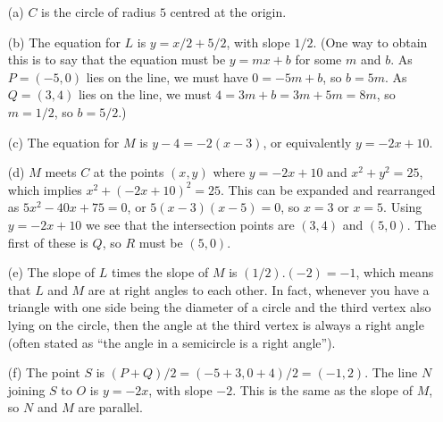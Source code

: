 \documentclass[a4paper]{amsart}
\theoremstyle{definition}
\newenvironment{solution}{{\noindent \bf Solution:}}{}
\begin{document}
\begin{solution}
 \begin{center}\end{center}
 \begin{itemize}
  \item[(a)] $C$ is the circle of radius $5$ centred at the origin.
  \item[(b)] The equation for $L$ is $y=x/2+5/2$, with slope $1/2$.
   (One way to obtain this is to say that the equation must be $y=mx+b$
   for some $m$ and $b$.  As $P=(-5,0)$ lies on the line, we must have
   $0=-5m+b$, so $b=5m$.  As $Q=(3,4)$ lies on the line, we must
   $4=3m+b=3m+5m=8m$, so $m=1/2$, so $b=5/2$.)
  \item[(c)] The equation for $M$ is $y-4=-2(x-3)$, or equivalently
   $y=-2x+10$. 
  \item[(d)] $M$ meets $C$ at the points $(x,y)$ where $y=-2x+10$
   and $x^2+y^2=25$, which implies $x^2+(-2x+10)^2=25$.  This can be
   expanded and rearranged as $5x^2-40x+75=0$, or $5(x-3)(x-5)=0$, so
   $x=3$ or $x=5$.  Using $y=-2x+10$ we see that the intersection
   points are $(3,4)$ and $(5,0)$.  The first of these is $Q$, so $R$
   must be $(5,0)$.
  \item[(e)] The slope of $L$ times the slope of $M$ is
   $(1/2).(-2)=-1$, which means that $L$ and $M$ are at right angles
   to each other.  In fact, whenever you have a triangle with one side
   being the diameter of a circle and the third vertex also lying on
   the circle, then the angle at the third vertex is always a right
   angle (often stated as ``the angle in a semicircle is a right
   angle''). 
  \item[(f)] The point $S$ is $(P+Q)/2=(-5+3,0+4)/2=(-1,2)$.  The line
   $N$ joining $S$ to $O$ is $y=-2x$, with slope $-2$.  This is the
   same as the slope of $M$, so $N$ and $M$ are parallel.
 \end{itemize}
\end{solution}
\end{document}
